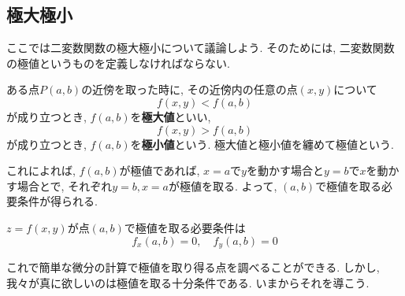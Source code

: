     \subsection{極大極小}
        ここでは二変数関数の極大極小について議論しよう. そのためには, 二変数関数の極値というものを定義しなければならない.

        \begin{screen}
            ある点$P(a,b)$の近傍を取った時に, その近傍内の任意の点$(x,y)$について
            \begin{equation}
                f(x,y)<f(a,b) \label{eq:偏微分:極大の定義}
            \end{equation}
            が成り立つとき, $f(a,b)$を\textbf{極大値}といい,
            \begin{equation}
                f(x,y)>f(a,b) \label{eq:偏微分:極小の定義}
            \end{equation}                 
            が成り立つとき, $f(a,b)$を\textbf{極小値}という. 極大値と極小値を纏めて極値という.
        \end{screen}
        これによれば, $f(a,b)$が極値であれば, $x=a$で$y$を動かす場合と$y=b$で$x$を動かす場合とで, それぞれ$y=b,x=a$が極値を取る.
        よって, $(a,b)$で極値を取る必要条件が得られる.
        \begin{screen}
            $z=f(x,y)$が点$(a,b)$で極値を取る必要条件は
            \begin{equation}
                f_{x}(a,b)=0,\quad f_{y}(a,b)=0 \label{eq:偏微分:極値を取る必要条件}
            \end{equation}
        \end{screen}
        これで簡単な微分の計算で極値を取り得る点を調べることができる. しかし, 我々が真に欲しいのは極値を取る十分条件である. いまからそれを導こう.


